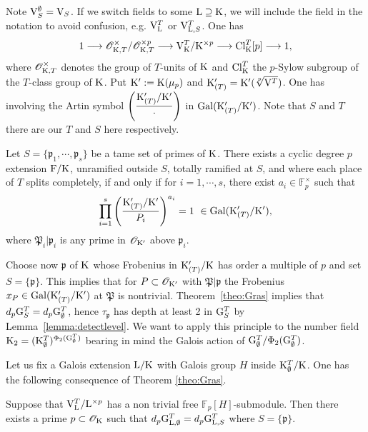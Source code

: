 \documentclass[12pt,a4paper,twoside,english]{smfart}
\def\fq{{\mathbb F}}
\def\p{{\mathfrak p}}
\def\P{{\mathfrak P}}
\def\G{{\rm G}}
\def\K{{\rm K}}
\def\L{{\rm L}}
\def\F{{\rm F}}
\def\V{{\rm V}}
\def\O{{\mathcal O}}
\def\Gal{{\rm Gal}}
\def\Cl{{\rm Cl}}
\def\FF#1#2{{\displaystyle{\left(\frac{#1}{#2}\right)}}}
\begin{document}
Note  $\V^\emptyset_S = \V_S$. If we switch fields to some $\L \supseteq \K$, we will include the field in the notation
to avoid confusion, e.g. $\V^T_\L$ or $\V^T_{\L,S}$. 
One  has 
\begin{eqnarray} \label{ES1} 1\longrightarrow \O_{\K,T}^{\times}/\O_{\K,T}^{\times p} \longrightarrow \V_\K^T/\K^{\times p} \longrightarrow \Cl_\K^T[p] \longrightarrow 1,\end{eqnarray}
where  $\O_{\K,T}^{ \times}$ denotes the group of $T$-units  of $\K$ and $\Cl_\K^T$ the $p$-Sylow subgroup of the $T$-class group of $\K$.
Put $\K':=\K(\mu_p)$ and
$\K_{(T)}'=\K'(\sqrt[p]{\V^T})$.
 One has  \cite[Chapter V, Corollary 2.4.2]{gras} involving the Artin symbol $ \FF{\K_{(T)}'/\K'}{\cdot}$ in $\Gal(\K_{(T)}'/\K')$.
 Note that $S$ and $T$ there are our $T$ and $S$ here respectively. 
\begin{theo}[Gras] \label{theo:Gras}
Let $S=\{\p_1,\cdots, \p_s\}$ be a tame set of  primes of $\K$.
There exists a cyclic degree $p$ extension $\F/\K$, unramified outside $S$, totally ramified at $S$, and where each place of $T$ splits completely, if and only if for  $i=1,\cdots, s$, there exist $a_i \in \fq_p^\times$ such that
$$\prod_{i=1}^s \FF{\K_{(T)}'/\K'}{\P_i}^{a_i} =1 \ \in \Gal(\K_{(T)}'/\K'),$$
where $\P_i|\p_i$ is any prime in  $\O_{\K'}$ above $\p_i$. 
\end{theo}



Choose now $\p$ of $\K$ whose Frobenius in $\K'_{(T)}/\K$ has order a multiple of $p$ and set $S=\{\p\}$.
 This implies that for $\P\subset \O_{\K'}$ with $\P | \p$ the Frobenius $x_\P \in \Gal(\K'_{(T)}/\K')$ at $\P$ is nontrivial.
Theorem~\ref{theo:Gras} implies  that $d_p \G_S^T=d_p \G_\emptyset^T$, hence $\tau_\p$ has depth at least 2 in $\G_S^T$ by Lemma~\ref{lemma:detectlevel}. 
We want to apply  this principle to the number field $\K_2=(\K_\emptyset^T)^{\Phi_2(\G_\emptyset^T)}$ bearing in mind the Galois action of $\G_\emptyset^T/\Phi_2(\G_\emptyset^T)$.

\medskip

Let us fix a Galois extension $\L/\K$ with Galois group $H$ inside $\K_\emptyset^T/\K$.
One has the following consequence of Theorem \ref{theo:Gras}.

\begin{coro} \label{lemm:freesubmodule} 
Suppose that $\V_{\L}^T/\L^{\times p}$ has a non trivial free $\fq_p[H]$-submodule.
Then there exists a prime $\p \subset \O_\K$ such that   $d_p \G_{\L,\emptyset}^T=d_p \G_{\L,S}^T$ where $S=\{\p\}$. 
\end{coro}
\end{document}
